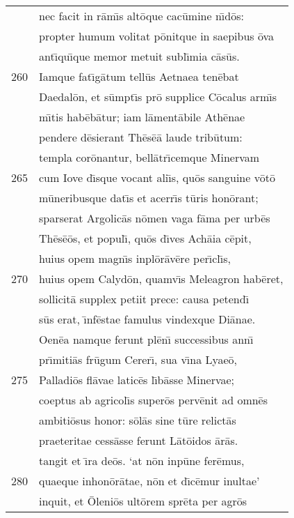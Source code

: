 \documentclass[paper=6in:9in,pagesize=pdftex,
               headinclude=on,footinclude=on,12pt]{scrbook}
\begin{document}
\begin{longtable}[p]{ r l }
 & nec facit in r\=am\={\i}s alt\=oque cac\=umine n\={\i}d\=os:\\ 
 & propter humum volitat p\=onitque in saepibus \=ova\\ 
 & ant\={\i}qu\={\i}que memor metuit subl\={\i}mia c\=as\=us.\\ 
260 & \indent Iamque fat\={\i}g\=atum tell\=us Aetnaea ten\=ebat\\ 
 & Daedal\=on, et s\=umpt\={\i}s pr\=o supplice C\=ocalus arm\={\i}s\\ 
 & m\={\i}tis hab\=eb\=atur; iam l\=ament\=abile Ath\=enae\\ 
 & pendere d\=esierant Th\=es\=e\=a laude trib\=utum:\\ 
 & templa cor\=onantur, bell\=atr\={\i}cemque Minervam\\ 
265 & cum Iove d\={\i}sque vocant ali\={\i}s, qu\=os sanguine v\=ot\=o\\ 
 & m\=uneribusque dat\={\i}s et acerr\={\i}s t\=uris hon\=orant;\\ 
 & sparserat Argolic\=as n\=omen vaga f\=ama per urb\=es\\ 
 & Th\=es\=e\=os, et popul\={\i}, qu\=os d\={\i}ves Ach\=aia c\=epit,\\ 
 & huius opem magn\={\i}s inpl\=or\=av\=ere per\={\i}cl\={\i}s,\\ 
270 & huius opem Calyd\=on, quamv\={\i}s Meleagron hab\=eret,\\ 
 & sollicit\=a supplex petiit prece: causa petend\={\i}\\ 
 & s\=us erat, \={\i}nf\=estae famulus vindexque Di\=anae.\\ 
 & Oen\=ea namque ferunt pl\=en\={\i} successibus ann\={\i}\\ 
 & pr\={\i}miti\=as fr\=ugum Cerer\={\i}, sua v\={\i}na Lyae\=o,\\ 
275 & Palladi\=os fl\=avae latic\=es l\={\i}b\=asse Minervae;\\ 
 & coeptus ab agricol\={\i}s super\=os perv\=enit ad omn\=es\\ 
 & ambiti\=osus honor: s\=ol\=as sine t\=ure relict\=as\\ 
 & praeteritae cess\=asse ferunt L\=at\=oidos \=ar\=as.\\ 
 & tangit et \={\i}ra de\=os. `at n\=on inp\=une fer\=emus,\\ 
280 & quaeque inhon\=or\=atae, n\=on et d\={\i}c\=emur inultae'\\ 
 & inquit, et \=Oleni\=os ult\=orem spr\=eta per agr\=os\\ 

\end{longtable}
\end{document}
